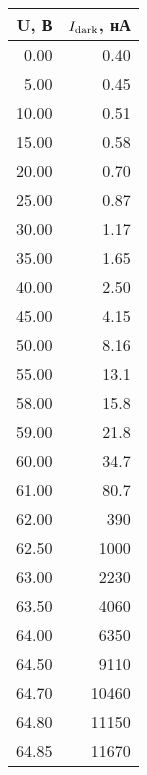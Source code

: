 \begin{tabular}{rr}
\toprule
    U, В &        $I_{\textnormal{dark}}$,  нА\\
\midrule
 0.00 &     0.40 \\
 5.00 &     0.45 \\
10.00 &     0.51 \\
15.00 &     0.58 \\
20.00 &     0.70 \\
25.00 &     0.87 \\
30.00 &     1.17 \\
35.00 &     1.65 \\
40.00 &     2.50 \\
45.00 &     4.15 \\
50.00 &     8.16 \\
55.00 &    13.1 \\
58.00 &    15.8 \\
59.00 &    21.8 \\
60.00 &    34.7 \\
61.00 &    80.7 \\
62.00 &   390 \\
62.50 &  1000 \\
63.00 &  2230 \\
63.50 &  4060 \\
64.00 &  6350 \\
64.50 &  9110 \\
64.70 & 10460 \\
64.80 & 11150 \\
64.85 & 11670 \\
\bottomrule
\end{tabular}